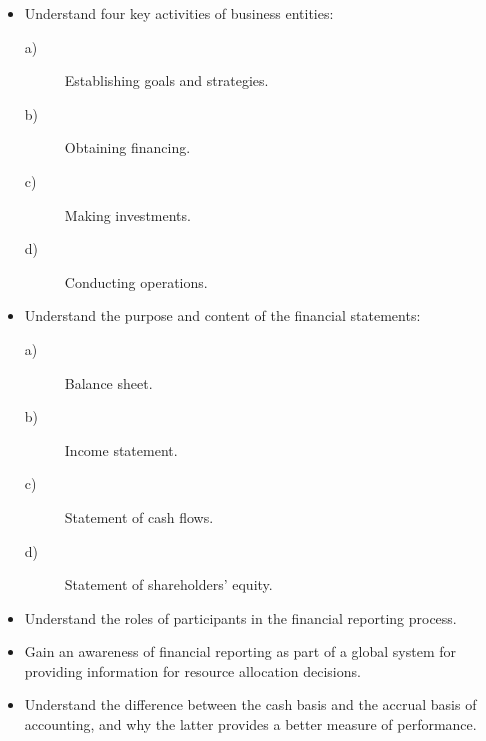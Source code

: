 \documentclass{article}\usepackage[]{graphicx}\usepackage[]{xcolor}
\begin{document}
\begin{itemize}
  
  \item Understand four key activities of business entities:
  
    \begin{description}
      \item[a)] Establishing goals and strategies.
      \item[b)] Obtaining financing.
      \item[c)] Making investments.
      \item[d)] Conducting operations.
    \end{description}
  
  \item Understand the purpose and content of the financial statements:
  
    \begin{description}
      \item[a)] Balance sheet.
      \item[b)] Income statement.
      \item[c)] Statement of cash flows.
      \item[d)] Statement of shareholders' equity.
    \end{description}
    
  \item Understand the roles of participants in the financial reporting process.
  
  \item Gain an awareness of financial reporting as part of a global system for providing 
        information for resource allocation decisions.
  
  \item Understand the difference between the cash basis and the accrual basis of accounting, 
        and why the latter provides a better measure of performance.
        
\end{itemize}
\end{document}
